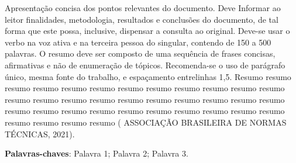 \begin{resumo}
Apresentação concisa dos pontos relevantes do documento. Deve Informar ao leitor 
finalidades, metodologia, resultados e conclusões do documento, de tal forma que 
este possa, inclusive, dispensar a consulta ao original. Deve-se usar o verbo na voz 
ativa e na terceira pessoa do singular, contendo de 150 a 500 palavras. O resumo 
deve ser composto de uma sequência de frases concisas, afirmativas e não de 
enumeração de tópicos. Recomenda-se o uso de parágrafo único, mesma fonte do 
trabalho, e espaçamento entrelinhas 1,5. Resumo resumo resumo resumo resumo 
resumo resumo resumo resumo resumo resumo resumo resumo resumo resumo 
resumo resumo resumo resumo resumo resumo resumo resumo resumo resumo 
resumo resumo resumo resumo resumo resumo resumo resumo resumo resumo 
resumo ( ASSOCIAÇÃO BRASILEIRA DE NORMAS TÉCNICAS, 2021).
\vspace{\onelineskip}
\noindent

\textbf{Palavras-chaves}: Palavra 1; Palavra 2; 
Palavra 3.
\end{resumo}